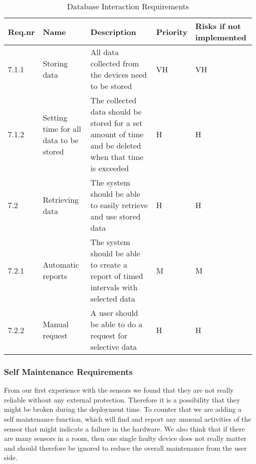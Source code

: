 \documentclass[../document]{subfiles}
\begin{document}
\begin{table}[H]
\caption{Database Interaction Requirements}
\centering
\begin{tabularx}{\textwidth}{|l|X|X|l|X|}
	\hline
	Req.nr
	&Name
	&Description
	&Priority
	&Risks if not implemented
	\\ \hline 7.1.1
	&Storing data
	&All data collected from the devices need to be stored
	&VH
	&VH
	\\ \hline 7.1.2
	&Setting time for all data to be stored
	&The collected data should be stored for a set amount of time and be deleted when that time is exceeded
	&H
	&H
	\\ \hline 7.2
	&Retrieving data
	&The system should be able to easily retrieve and use stored data
	&H
	&H
	\\ \hline 7.2.1
	&Automatic reports
	&The system should be able to create a report of timed intervals with selected data
	&M
	&M
	\\ \hline 7.2.2
	&Manual request
	&A user should be able to do a request for selective data
	&H
	&H
	\\ \hline 
\end{tabularx}
\end{table}

\subsubsection{Self Maintenance Requirements}
From our first experience with the sensors we found that they are not really reliable without any external protection. Therefore it is a possibility that they might be broken during the deployment time. To counter that we are adding a self maintenance function, which will find and report any unusual activities of the sensor that might indicate a failure in the hardware. We also think that if there are many sensors in a room, then one single faulty device does not really matter and should therefore be ignored to reduce the overall maintenance from the user side.
\end{document}
